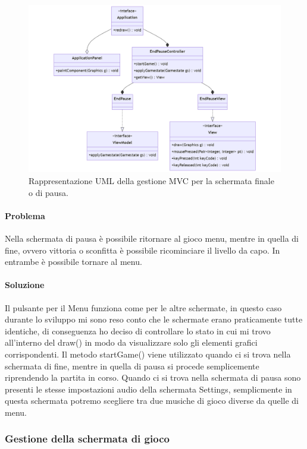 \documentclass[a4paper,12pt]{report}
\begin{document}
\begin{figure}[H]
\centering{}
\includegraphics[width=\textwidth]{img/endpause.png}
\caption{Rappresentazione UML della gestione MVC per la schermata finale o di pausa.}
\end{figure}

\paragraph{Problema} Nella schermata di pausa è possibile ritornare al gioco menu, mentre in quella di fine, ovvero vittoria o sconfitta è possibile ricominciare il livello da capo. In entrambe è possibile tornare al menu.

\paragraph{Soluzione} Il pulsante per il Menu funziona come per le altre schermate, in questo caso durante lo sviluppo mi sono reso conto che le schermate erano praticamente tutte identiche, di conseguenza ho deciso di controllare lo stato in cui mi trovo all’interno del draw() in modo da visualizzare solo gli elementi grafici corrispondenti. Il metodo startGame() viene utilizzato quando ci si trova nella schermata di fine, mentre in quella di pausa si procede semplicemente riprendendo la partita in corso. Quando ci si trova nella schermata di pausa sono presenti le stesse impostazioni audio della schermata Settings, semplicmente in questa schermata potremo scegliere tra due musiche di gioco diverse da quelle di menu.

\subsubsection{Gestione della schermata di gioco}
\end{document}
